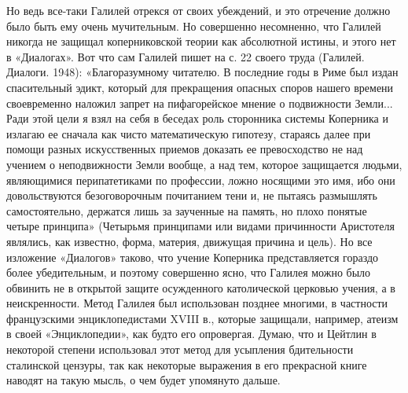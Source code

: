 Но ведь все-таки  Галилей отрекся от своих убеждений,  и это отречение
должно было быть ему очень  мучительным. Но совершенно несомненно, что
Галилей  никогда  не  защищал  коперниковской  теории  как  абсолютной
истины, и этого нет  в «Диалогах». Вот что сам Галилей  пишет на с. 22
своего  труда (Галилей.  Диалоги. 1948):  «Благоразумному читателю.  В
последние  годы  в Риме  был  издан  спасительный эдикт,  который  для
прекращения опасных споров нашего  времени своевременно наложил запрет
на пифагорейское мнение  о подвижности Земли... Ради этой  цели я взял
на  себя  в  беседах  роль  сторонника  системы  Коперника  и  излагаю
ее  сначала  как чисто  математическую  гипотезу,  стараясь далее  при
помощи разных  искусственных приемов доказать ее  превосходство не над
учением о  неподвижности Земли вообще,  а над тем,  которое защищается
людьми, являющимися  перипатетиками по  профессии, ложно  носящими это
имя,  ибо  они довольствуются  безоговорочным  почитанием  тени и,  не
пытаясь  размышлять  самостоятельно,  держатся лишь  за  заученные  на
память,  но плохо  понятые четыре  принципа» (Четырьмя  принципами или
видами причинности Аристотеля являлись,  как известно, форма, материя,
движущая  причина и  цель). Но  все изложение  «Диалогов» таково,  что
учение Коперника представляется гораздо  более убедительным, и поэтому
совершенно ясно, что Галилея можно  было обвинить не в открытой защите
осужденного  католической церковью  учения, а  в неискренности.  Метод
Галилея  был использован  позднее  многими,  в частности  французскими
энциклопедистами XVIII в., которые  защищали, например, атеизм в своей
«Энциклопедии»,  как будто  его  опровергая. Думаю,  что  и Цейтлин  в
некоторой степени  использовал этот  метод для  усыпления бдительности
сталинской цензуры, так как некоторые выражения в его прекрасной книге
наводят на такую мысль, о чем будет упомянуто дальше.

